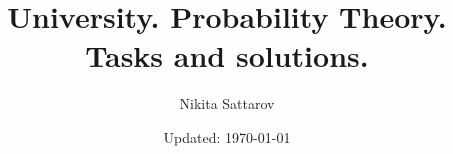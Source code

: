 \documentclass{article}
\title{University. Probability Theory. Tasks and solutions.}
\author{Nikita Sattarov}
\date{Updated: \today}
\begin{document}
\maketitle
\newcommand{\ds}{\displaystyle}

\newcommand*\circled[1]{\tikz[baseline=(char.base)]{\node[shape=circle,draw,inner sep=2pt] (char) {#1};}}


\newcommand{\answer}{\\ \textbf{Ответ: }}
\newcommand{\solution}{\\ \textbf{Решение: }}

\renewcommand{\theenumi}{\arabic{enumi}}
\renewcommand{\labelenumi}{\circled{\theenumi}}

\newcommand{\task}[3]{\item {#1} \\ \solution{#2} \\ \answer {#3}.}



\noindent
\end{document}
